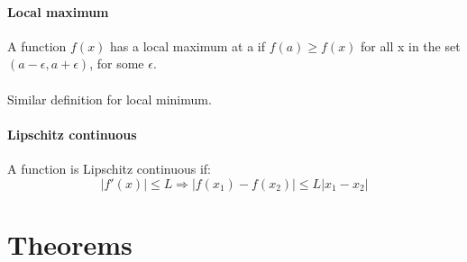 \documentclass{scrartcl}
\begin{document}
\paragraph{Local maximum}
A function $ f(x) $ has a local maximum at a if $ f(a) \geq f(x) $ for all x in the set $ (a - \epsilon, a + \epsilon) $, for some $ \epsilon $.
\\\\
Similar definition for local minimum.

\paragraph{Lipschitz continuous}
A function is Lipschitz continuous if:
\begin{equation}
|f'(x)| \leq L \Rightarrow |f(x_{1}) - f(x_{2})| \leq L|x_{1} - x_{2}|
\end{equation}

\section{Theorems}
\end{document}
